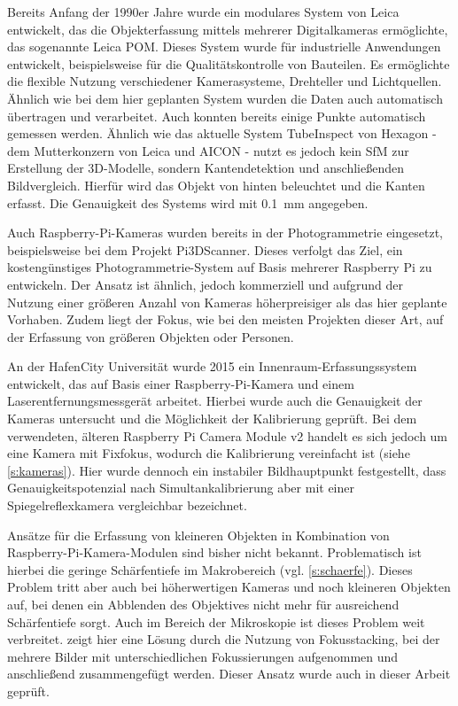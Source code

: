 \documentclass[./00PhotoBox]{subfiles}
\begin{document}
Bereits Anfang der 1990er Jahre wurde ein modulares System von Leica entwickelt, das die Objekterfassung mittels mehrerer Digitalkameras ermöglichte, das sogenannte Leica POM. Dieses System wurde für industrielle Anwendungen entwickelt, beispielsweise für die Qualitätskontrolle von Bauteilen. Es ermöglichte die flexible Nutzung verschiedener Kamerasysteme, Drehteller und Lichtquellen. Ähnlich wie bei dem hier geplanten System wurden die Daten auch au\-to\-ma\-tisch übertragen und verarbeitet. Auch konnten bereits einige Punkte au\-to\-ma\-tisch gemessen werden. Ähnlich wie das aktuelle System TubeInspect \citep[vgl.][]{aicon_tubeinspect} von Hexagon - dem Mutterkonzern von Leica und AICON - nutzt es jedoch kein \Gls{SfM} zur Erstellung der 3D-Modelle, sondern Kantendetektion und anschließenden Bildvergleich. Hierfür wird das Objekt von hinten beleuchtet und die Kanten erfasst. Die Genauigkeit des Systems wird mit \SI{0,1}{\milli\metre} angegeben.
\citep[vgl.][]{leica_pom_concept}

Auch Raspberry-Pi-Kameras wurden bereits in der Photogrammetrie eingesetzt, beispielsweise bei dem Projekt Pi3DScanner. Dieses verfolgt das Ziel, ein kostengünstiges Photo\-grammetrie-System auf Basis mehrerer Raspberry Pi zu entwickeln. Der Ansatz ist ähnlich, jedoch kommerziell und aufgrund der Nutzung einer größeren Anzahl von Kameras höherpreisiger als das hier geplante Vorhaben. Zudem liegt der Fokus, wie bei den meisten Projekten dieser Art, auf der Erfassung von größeren Objekten oder Personen.
\citep[vgl.][]{pi3dscanner}

An der HafenCity Universität wurde 2015 ein Innenraum-Erfassungssystem entwickelt, das auf Basis einer Raspberry-Pi-Kamera und einem Laserentfernungsmessgerät arbeitet. Hierbei wurde auch die Genauigkeit der Kameras untersucht und die Möglichkeit der Kalibrierung geprüft. Bei dem verwendeten, älteren Raspberry Pi Camera Module v2 handelt es sich jedoch um eine Kamera mit Fixfokus, wodurch die Kalibrierung vereinfacht ist (siehe \autoref{s:kameras}). Hier wurde dennoch ein instabiler \Gls{Bildhauptpunkt} festgestellt, dass Genauigkeitspotenzial nach Simultankalibrierung aber mit einer Spiegelreflexkamera vergleichbar bezeichnet.
\citep[vgl.][]{3d_raspi_laserscanner}

Ansätze für die Erfassung von kleineren Objekten in Kombination von Raspberry-Pi-Kamera-Modulen sind bisher nicht bekannt. Problematisch ist hierbei die geringe Schärfentiefe im Makrobereich (vgl. \autoref{s:schaerfe}). Dieses Problem tritt aber auch bei höherwertigen Kameras und noch kleineren Objekten auf, bei denen ein Abblenden des Objektives nicht mehr für ausreichend Schärfentiefe sorgt. Auch im Bereich der Mikroskopie ist dieses Problem weit verbreitet. \citet{focusstack_sfm} zeigt hier eine Lösung durch die Nutzung von Fokusstacking, bei der mehrere Bilder mit unterschiedlichen Fokussierungen aufgenommen und anschließend zusammengefügt werden. Dieser Ansatz wurde auch in dieser Arbeit geprüft.
\end{document}
